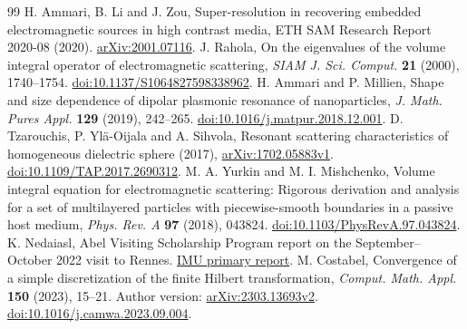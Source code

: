 \documentclass[11pt]{article}
\theoremstyle{remark}\newtheorem{remark}[theorem]{Remark}
\begin{document}
\begin{thebibliography}{99}
 H. Ammari, B. Li and J. Zou, Super-resolution in recovering embedded electromagnetic sources in high contrast media, ETH SAM Research Report 2020-08 (2020). \href{https://arxiv.org/abs/2001.07116}{arXiv:2001.07116}.
 J. Rahola, On the eigenvalues of the volume integral operator of electromagnetic scattering, \emph{SIAM J. Sci. Comput.} \textbf{21} (2000), 1740--1754. \href{https://doi.org/10.1137/S1064827598338962}{doi:10.1137/S1064827598338962}.
 H. Ammari and P. Millien, Shape and size dependence of dipolar plasmonic resonance of nanoparticles, \emph{J. Math. Pures Appl.} \textbf{129} (2019), 242--265. \href{https://doi.org/10.1016/j.matpur.2018.12.001}{doi:10.1016/j.matpur.2018.12.001}.
 D. Tzarouchis, P. Yl\"a-Oijala and A. Sihvola, Resonant scattering characteristics of homogeneous dielectric sphere (2017), \href{https://arxiv.org/abs/1702.05883v1}{arXiv:1702.05883v1}. \href{https://doi.org/10.1109/TAP.2017.2690312}{doi:10.1109/TAP.2017.2690312}.
 M. A. Yurkin and M. I. Mishchenko, Volume integral equation for electromagnetic scattering: Rigorous derivation and analysis for a set of multilayered particles with piecewise-smooth boundaries in a passive host medium, \emph{Phys. Rev. A} \textbf{97} (2018), 043824. \href{https://doi.org/10.1103/PhysRevA.97.043824}{doi:10.1103/PhysRevA.97.043824}.
 K. Nedaiasl, Abel Visiting Scholarship Program report on the September--October 2022 visit to Rennes. \href{https://www.mathunion.org/fileadmin/CDC/Grants/Abel\%20Visiting\%20Scholar\%20Program/2019/khadijeh_nedaiasl_report.pdf}{IMU primary report}.
 M. Costabel, Convergence of a simple discretization of the finite Hilbert transformation, \emph{Comput. Math. Appl.} \textbf{150} (2023), 15--21. Author version: \href{https://arxiv.org/abs/2303.13693v2}{arXiv:2303.13693v2}. \href{https://doi.org/10.1016/j.camwa.2023.09.004}{doi:10.1016/j.camwa.2023.09.004}.
\end{thebibliography}
\end{document}
